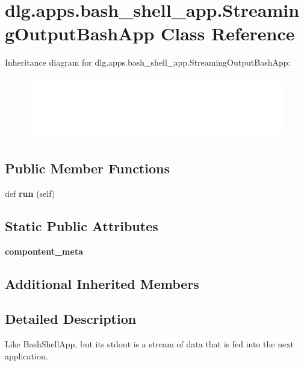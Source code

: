 \hypertarget{classdlg_1_1apps_1_1bash__shell__app_1_1_streaming_output_bash_app}{}\section{dlg.\+apps.\+bash\+\_\+shell\+\_\+app.\+Streaming\+Output\+Bash\+App Class Reference}
\label{classdlg_1_1apps_1_1bash__shell__app_1_1_streaming_output_bash_app}
Inheritance diagram for dlg.\+apps.\+bash\+\_\+shell\+\_\+app.\+Streaming\+Output\+Bash\+App\+:\begin{figure}[H]
\begin{center}
\leavevmode
\includegraphics[height=2.727273cm]{classdlg_1_1apps_1_1bash__shell__app_1_1_streaming_output_bash_app}
\end{center}
\end{figure}
\subsection*{Public Member Functions}
\begin{DoxyCompactItemize}
\item 
\mbox{\label{classdlg_1_1apps_1_1bash__shell__app_1_1_streaming_output_bash_app_a483933caf98aa8e8056067919e9b7850}} 
def {\bfseries run} (self)
\end{DoxyCompactItemize}
\subsection*{Static Public Attributes}
\begin{DoxyCompactItemize}
\item 
{\bfseries compontent\+\_\+meta}
\end{DoxyCompactItemize}
\subsection*{Additional Inherited Members}


\subsection{Detailed Description}
\begin{DoxyVerb}Like BashShellApp, but its stdout is a stream of data that is fed into the
next application.
\end{DoxyVerb}
 

